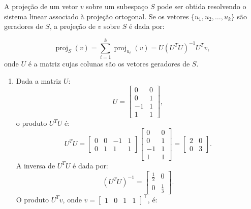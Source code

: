 \begin{resolution}
  A projeção de um vetor \( v \) sobre um subespaço \( S \) pode ser obtida resolvendo o sistema linear associado à projeção ortogonal. Se os vetores \(\{u_1, u_2, \ldots, u_k\}\) são geradores de \( S \), a projeção de \( v \) sobre $S$ é dada por:

  \begin{equation}
    \operatorname{proj}_S(v) = \sum\limits_{i=1}^k \operatorname{proj}_{u_i}(v) = U (U^T U)^{-1} U^T v,
  \end{equation}
  onde \( U \) é a matriz cujas colunas são os vetores geradores de \( S \).

  \begin{enumerate}[label=\alph*)]
    \item Dada a matriz \( U \):
          \[
            U = \begin{bmatrix}
              0  & 0 \\
              0  & 1 \\
              -1 & 1 \\
              1  & 1
            \end{bmatrix},
          \]
          o produto \( U^T U \) é:
          \[
            U^T U = \begin{bmatrix}
              0 & 0 & -1 & 1 \\
              0 & 1 & 1  & 1
            \end{bmatrix}
            \begin{bmatrix}
              0  & 0 \\
              0  & 1 \\
              -1 & 1 \\
              1  & 1
            \end{bmatrix}
            = \begin{bmatrix}
              2 & 0 \\
              0 & 3
            \end{bmatrix}.
          \]
          A inversa de \( U^T U \) é dada por:
          \[
            (U^T U)^{-1} = \begin{bmatrix}
              \frac{1}{2} & 0           \\
              0           & \frac{1}{3}
            \end{bmatrix}.
          \]
          O produto \( U^T v \), onde \( v = \begin{bmatrix} 1 & 0 & 1 & 1 \end{bmatrix}^{\top} \), é:

\end{enumerate}
\end{resolution}
